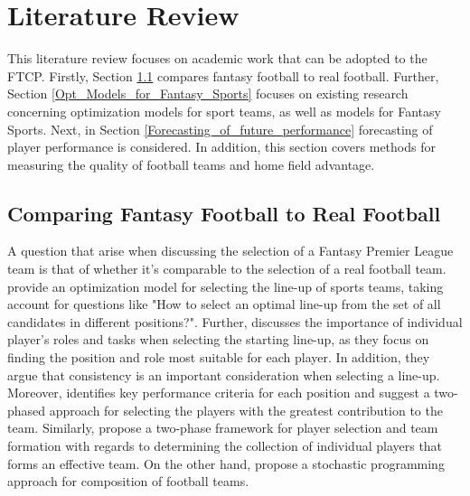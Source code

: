 
\chapter{Literature Review}
This literature review focuses on academic work that can be adopted to the FTCP. Firstly, Section \ref{Literature_fantasy_real} compares fantasy football to real football. Further, Section \ref{Opt_Models_for_Fantasy_Sports} focuses on existing research concerning optimization models for sport teams, as well as models for Fantasy Sports. Next, in Section \ref{Forecasting_of_future_performance} forecasting of player performance is considered. In addition, this section covers methods for measuring the quality of football teams and home field advantage.

\section{Comparing Fantasy Football to Real Football} \label{Literature_fantasy_real}

A question that arise when discussing the selection of a Fantasy Premier League team is that of whether it's comparable to the selection of a real football team. \cite{Boon} provide an optimization model for selecting the line-up of sports teams, taking account for questions like "How to select an optimal line-up from the set of all candidates in different positions?". Further, \cite{Trninic} discusses the importance of individual player's roles and tasks when selecting the starting line-up, as they focus on finding the position and role most suitable for each player. In addition, they argue that consistency is an important consideration when selecting a line-up. Moreover, \cite{Ozceylan} identifies key performance criteria for each position and suggest a two-phased approach for selecting the players with the greatest contribution to the team. Similarly, \cite{Tavana} propose a two-phase framework for player selection and team formation with regards to determining the collection of individual players that forms an effective team. On the other hand, \cite{Pantuso} propose a stochastic programming approach for composition of football teams. 

\newpar

